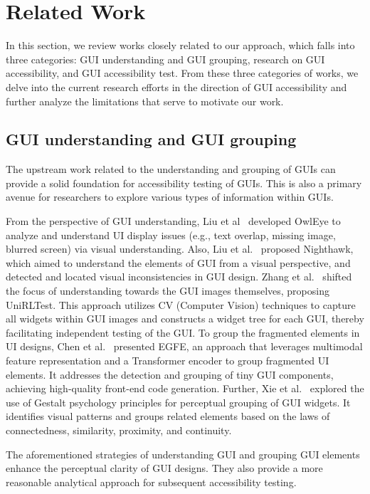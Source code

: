 \section{Related Work}
\label{sec: related work}
In this section, we review works closely related to our approach, which falls into three categories: GUI understanding and GUI grouping, research on GUI accessibility, and GUI accessibility test.
From these three categories of works, we delve into the current research efforts in the direction of GUI accessibility and further analyze the limitations that serve to motivate our work.
\vspace{-0.42em}

\subsection{GUI understanding and GUI grouping}
The upstream work related to the understanding and grouping of GUIs can provide a solid foundation for accessibility testing of GUIs. 
This is also a primary avenue for researchers to explore various types of information within GUIs. 

From the perspective of GUI understanding, Liu et al~\cite{Liu2020OwlES} developed OwlEye to analyze and understand UI display issues (e.g., text overlap, missing image, blurred screen) via visual understanding.
Also, Liu et al.~\cite{Liu2022NighthawkFA} proposed Nighthawk, which aimed to understand the elements of GUI from a visual perspective, and detected and located visual inconsistencies in GUI design.
Zhang et al.~\cite{Zhang2022UniRLTestUP} shifted the focus of understanding towards the GUI images themselves, proposing UniRLTest. 
This approach utilizes CV (Computer Vision) techniques to capture all widgets within GUI images and constructs a widget tree for each GUI, thereby facilitating independent testing of the GUI.
To group the fragmented elements in UI designs, Chen et al.~\cite{Chen2023EGFEEG} presented EGFE, an approach that leverages multimodal feature representation and a Transformer encoder to group fragmented UI elements. 
It addresses the detection and grouping of tiny GUI components, achieving high-quality front-end code generation.
Further, Xie et al.~\cite{Xie2022PsychologicallyinspiredUI} explored the use of Gestalt psychology principles for perceptual grouping of GUI widgets. 
It identifies visual patterns and groups related elements based on the laws of connectedness, similarity, proximity, and continuity.

The aforementioned strategies of understanding GUI and grouping GUI elements enhance the perceptual clarity of GUI designs. 
They also provide a more reasonable analytical approach for subsequent accessibility testing.


